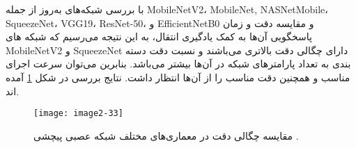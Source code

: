 با بررسی شبکه‌های به‌روز از جمله MobileNetV2، MobileNet, NASNetMobile، SqueezeNet، VGG19، ResNet-50، و EfficientNetB0
و مقایسه دقت و زمان پاسخگویی آن‌ها به کمک یادگیری انتقال، به این نتیجه می‌رسیم که شبکه های MobileNetV2 و SqueezeNet دارای چگالی دقت بالاتری می‌باشند و نسبت دقت دسته بندی به تعداد پارامترهای شبکه در آن‌ها بیشتر می‌باشد. بنابرین می‌توان سرعت اجرای مناسب و همچنین دقت مناسب را از آن‌ها انتظار داشت. نتایج بررسی در شکل \ref{image2-33} آمده اند.

\begin{figure}[h]
\centering
  \texttt{[image: image2-33]}
  \caption{
  مقایسه چگالی دقت در معماری‌های مختلف شبکه عصبی پیچشی 
   \cite{Bianco_2018}.}
  \label{image2-33}
\end{figure}